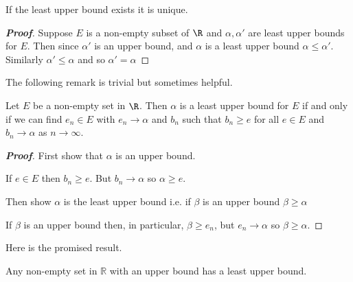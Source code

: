 \begin{lemma}\label{lem:supremum_real_uniqueness}
If the least upper bound exists it is unique.
\end{lemma}

\begin{proof}[\bf Proof]
Suppose $E$ is a non-empty subset of $\R$ and $\alpha, \alpha'$ are least upper bounds for $E$. Then since $\alpha'$ is an upper bound, and $\alpha$ is a least upper bound $\alpha \leq \alpha'$. Similarly $\alpha' \leq \alpha$ and so $\alpha' = \alpha$
\end{proof}

The following remark is trivial but sometimes helpful.

\begin{lemma}\label{lem:supremum_real_existence}
Let $E$ be a non-empty set in $\R$. Then $\alpha$ is a least upper bound for $E$ if and only if we can find $e_n \in E$ with $e_n \rightarrow \alpha$ and $b_n$ such that $b_n \geq e$ for all $e \in E$ and $b_n \to \alpha$ as $n \to \infty$.
\end{lemma}

\begin{proof}[\bf Proof]
First show that $\alpha$ is an upper bound.

If $e \in E$ then $b_n \geq e$. But $b_n \to \alpha$ so $\alpha \geq e$.

Then show $\alpha$ is the least upper bound i.e. if $\beta$ is an upper bound $\beta \geq \alpha$

If $\beta$ is an upper bound then, in particular, $\beta \geq e_n$, but $e_n \to \alpha$ so $\beta \geq \alpha$.
\end{proof}



Here is the promised result.

\begin{theorem}\label{thm:upper_bound_implies_least_upper_bound}
Any non-empty set in $\mathbb{R}$ with an upper bound has a least upper bound.
\end{theorem}


